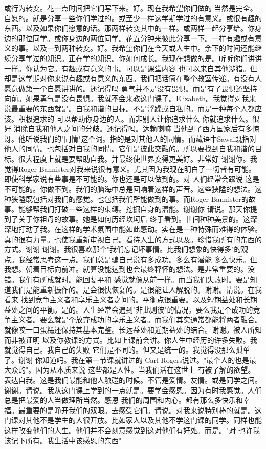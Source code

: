 或行为转变。花一点时间把它们写下来。好。现在我希望你们做的 当然是完全。自愿的。就是分享一些你们学过的。或至少一样这学期学过的有意义。或很有趣的东西。以及如果你们愿意的话。那两样转变其中的一样。或两样一起分享给。你身边的那位同学。或你身边的两位同学。花五分钟来彼此分享一下。一样有趣或有意义的事。以及一到两种转变。好。我希望你们在今天或人生中。余下的时间还能继续分享学过的知识。正在学的知识。你如何成长。我现在想做的是。听听你们讲讲一样。你认为它。有趣或有意义的事。可以是课堂内容 也可以来自其他涉猎。但却是这学期对你来说有趣或有意义的东西。我们把话筒在整个教室传递。有没有人愿意做第一个自愿讲讲的。还记得吗 勇气并不是没有畏惧。而是有了畏惧还坚持向前。如果勇气是没有畏惧。我就不会来教这门课了。Elizabeth。我觉得对我来说最重要的东西就是。自我和谐的目标。不是浮躁或自私的。而是一种每个人都应该。积极追求的 可以帮助你身边的人。而非别人让你追求什么 你就追求什么。很好 消除自我和他人之间的分歧。还记得吗。达赖喇嘛 当他到了西方国家后有多惊讶。他听说我们的"同情"这个词。指的是对其他人的同情。而藏语中Sawai既指对他人的同情。也包括对自我的同情。它们是彼此交融的。所以要找到自我和谐的目标。很大程度上就是要帮助自我。并最终使世界变得更美好。非常好 谢谢你。我觉得Roger Bannister对我来说很有意义。尤其因为我现在明白了一切皆有可能。即使科学家说有些事是不可能的。你也还是可以做到的。对 人们经常会跟说 这是不可能的。你做不到。我们的脑海中总是回响着这样的声音。这些狭隘的想法。这种狭隘既包括对我们的感觉。也包括我们所能做到的事。而Roger Bannister的故事。能够帮我们打破一些这样的束缚。挖掘自身的潜能。谢谢你 请说。那天你提到了关于你祖母的故事。她是如何历经坎坷后 终于看到。世间种种美景的。这深深地打动了我。在这样的学术氛围中能如此感动。实在是一种特殊而难得的体验。真的很有力量。也使我重新审视自己。看待人生的方式以及。珍惜我所有的东西的方式。谢谢 谢谢。我很喜欢那个"我们忘记坏事情。比我们想象的快得多"的观点。我经常思考这一点。我们总是骗自己说有多成功。多么有潜能 多么快乐。但我想。朝着目标向前冲。就算没能达到也会最终释怀的想法。是非常重要的。没错。我们有所成就时。能回复平和 感觉就像从前一样。而当我们失败时。要是知道我们是能重新振作的。是会很快恢复的。是很能让人解脱的。谢谢。请说。在我看来 找到竞争主义者和享乐主义者之间的。平衡点很重要。以及短期益处和长期益处之间的平衡。是的。人生经常会遇到"非此则彼"的情况。要么我是个成功的竞争主义者。要么就是个放弃成功的享乐主义者。而我们其实通常都能将两者融合。就像咬一口蛋糕还保持其基本完整。长远益处和近期益处的结合。谢谢。被人所知而非被证明 以及你教课的方式。比如上课前会讲。你人生中经历的许多失败。我就觉得自己。我自己的失败 它们是不同的。但又是统一的。我觉得没那么孤单了。谢谢 你知道吗。我在第一节课就讲过的 Carl Rogers说过。"最个人的也是最大众的"。因为从本质来说 这些都是人性。当我们活在这世上 有被了解的欲望。表达自我。这是我们最能和他人触碰的时候。不管是爱情。友情。或是同学之间。谢谢。请说。我从这门课上学到的一点就是。要学会感恩。因为有时我感觉。人们总是把最爱的人当做理所当然。感恩 我们的周围和内心。都有那么多快乐和幸福。最重要的是睁开我们的双眼。去感受它们。请说。对我来说特别棒的就是。这门课对其他不是学生的人很开放。比如家人以及其他不学这门课的同学。同样也能这样改变他们的人生。他们并不会刻意感觉到这对他们有好处。而是。"对 也许我该记下所有。我生活中该感恩的东西" 